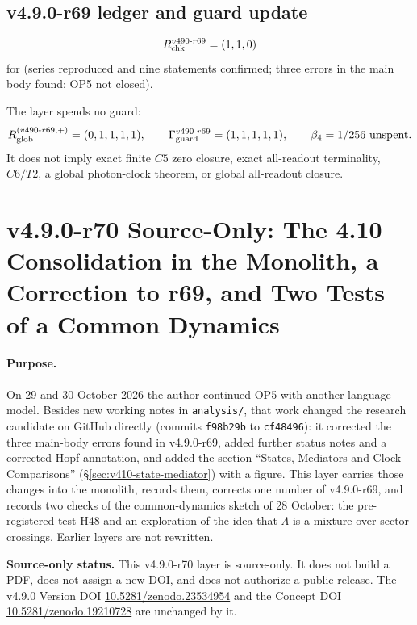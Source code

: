 \subsection*{v4.9.0-r69 ledger and guard update}
\label{subsec:v490-r69-ledger-guard}

\[
R_{\rm chk}^{v490\text{-}r69}=(1,1,0)
\]
for (series reproduced and nine statements confirmed; three errors in the main body found; OP5 not closed).

The layer spends no guard:
\[
R_{\rm glob}^{(v490\text{-}r69,+)}=(0,1,1,1,1),
\qquad
\Gamma_{\rm guard}^{v490\text{-}r69}=(1,1,1,1,1),
\qquad
\beta_4=1/256\ \text{unspent}.
\]
It does not imply exact finite \(C5\) zero closure, exact all-readout terminality,
\(C6/T2\), a global photon-clock theorem, or global all-readout closure.

\clearpage
\section*{v4.9.0-r70 Source-Only: The 4.10 Consolidation in the Monolith, a Correction to r69, and Two Tests of a Common Dynamics}
\label{sec:v490-r70-consolidation}

\paragraph{Purpose.}
On 29 and 30 October 2026 the author continued OP5 with another language model.  Besides new working notes in \texttt{analysis/}, that work
changed the research candidate on GitHub directly (commits \texttt{f98b29b} to \texttt{cf48496}): it corrected the three main-body errors found in
v4.9.0-r69, added further status notes and a corrected Hopf annotation, and added the section ``States, Mediators and Clock Comparisons''
(\S\ref{sec:v410-state-mediator}) with a figure.  This layer carries those changes into the monolith, records them, corrects one number of
v4.9.0-r69, and records two checks of the common-dynamics sketch of 28 October: the pre-registered test H48 and an exploration of the idea that
\(\Lambda\) is a mixture over sector crossings.  Earlier layers are not rewritten.

\noindent\textbf{Source-only status.}
This v4.9.0-r70 layer is source-only.  It does not build a PDF, does not assign a new DOI,
and does not authorize a public release.  The v4.9.0 Version DOI
\href{https://doi.org/10.5281/zenodo.23534954}{10.5281/zenodo.23534954} and the Concept DOI
\href{https://doi.org/10.5281/zenodo.19210728}{10.5281/zenodo.19210728} are unchanged by it.

